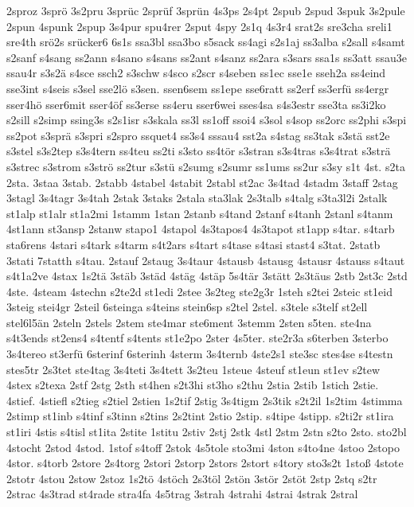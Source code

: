 {2sproz
3sprö
3s2pru
3sprüc
2sprüf
3sprün
4s3ps
2s4pt
2spub
2spud
3spuk
3s2pule
2spun
4spunk
2spup
3s4pur
spu4rer
2sput
4spy
2s1q
4s3r4
srat2s
sre3cha
sreli1
sre4th
srö2s
srücker6
6s1s
ssa3bl
ssa3bo
s5sack
ss4agi
s2s1aj
ss3alba
s2sall
s4samt
s2sanf
s4sang
ss2ann
s4sano
s4sans
ss2ant
s4sanz
ss2ara
s3sars
ssa1s
ss3att
ssau3e
ssau4r
s3s2ä
s4sce
ssch2
s3schw
s4sco
s2scr
s4seben
ss1ec
sse1e
sseh2a
ss4eind
sse3int
s4seis
s3sel
sse2lö
s3sen.
ssen6sem
ss1epe
sse6ratt
ss2erf
ss3erfü
ss4ergr
sser4hö
sser6mit
sser4öf
ss3erse
ss4eru
sser6wei
sses4sa
s4s3estr
sse3ta
ss3i2ko
s2sill
s2simp
ssing3s
s2s1isr
s3skala
ss3l
ss1off
ssoi4
s3sol
s4sop
ss2orc
ss2phi
s3spi
ss2pot
s3sprä
s3spri
s2spro
ssquet4
ss3s4
sssau4
sst2a
s4stag
ss3tak
s3stä
sst2e
s3stel
s3s2tep
s3s4tern
ss4teu
ss2ti
s3sto
ss4tör
s3stran
s3s4tras
s3s4trat
s3strä
s3strec
s3strom
s3strö
ss2tur
s3stü
s2sumg
s2sumr
ss1ums
ss2ur
s3sy
s1t
4st.
s2ta
2sta.
3staa
3stab.
2stabb
4stabel
4stabit
2stabl
st2ac
3s4tad
4stadm
3staff
2stag
3stagl
3s4tagr
3s4tah
2stak
3staks
2stala
sta3lak
2s3talb
s4talg
s3ta3l2i
2stalk
st1alp
st1alr
st1a2mi
1stamm
1stan
2stanb
s4tand
2stanf
s4tanh
2stanl
s4tanm
4st1ann
st3ansp
2stanw
stapo1
4stapol
4s3tapos4
4s3tapot
st1app
s4tar.
s4tarb
sta6rens
4stari
s4tark
s4tarm
s4t2ars
s4tart
s4tase
s4tasi
stast4
s3tat.
2statb
3stati
7statth
s4tau.
2stauf
2staug
3s4taur
4stausb
4stausg
4stausr
4stauss
s4taut
s4t1a2ve
4stax
1s2tä
3stäb
3städ
4stäg
4stäp
5s4tär
3stätt
2s3täus
2stb
2st3c
2std
4ste.
4steam
4stechn
s2te2d
st1edi
2stee
3s2teg
ste2g3r
1steh
s2tei
2steic
st1eid
3steig
stei4gr
2steil
6steinga
s4teins
stein6sp
s2tel
2stel.
s3tele
s3telf
st2ell
stel6l5än
2steln
2stels
2stem
ste4mar
ste6ment
3stemm
2sten
s5ten.
ste4na
s4t3ends
st2ens4
s4tentf
s4tents
st1e2po
2ster
4s5ter.
ste2r3a
s6terben
3sterbo
3s4tereo
st3erfü
6sterinf
6sterinh
4sterm
3s4ternb
4ste2s1
ste3sc
stes4se
s4testn
stes5tr
2s3tet
ste4tag
3s4teti
3s4tett
3s2teu
1steue
4steuf
st1eun
st1ev
s2tew
4stex
s2texa
2stf
2stg
2sth
st4hen
s2t3hi
st3ho
s2thu
2stia
2stib
1stich
2stie.
4stief.
4stiefl
s2tieg
s2tiel
2stien
1s2tif
2stig
3s4tigm
2s3tik
s2t2il
1s2tim
4stimma
2stimp
st1inb
s4tinf
s3tinn
s2tins
2s2tint
2stio
2stip.
s4tipe
4stipp.
s2ti2r
st1ira
st1iri
4stis
s4tisl
st1ita
2stite
1stitu
2stiv
2stj
2stk
4stl
2stm
2stn
s2to
2sto.
sto2bl
4stocht
2stod
4stod.
1stof
s4toff
2stok
4s5tole
sto3mi
4ston
s4to4ne
4stoo
2stopo
4stor.
s4torb
2store
2s4torg
2stori
2storp
2stors
2stort
s4tory
sto3s2t
1stoß
4stote
2stotr
4stou
2stow
2stoz
1s2tö
4stöch
2s3töl
2stön
3stör
2stöt
2stp
2stq
s2tr
2strac
4s3trad
st4rade
stra4fa
4s5trag
3strah
4strahi
4strai
4strak
2stral
}
